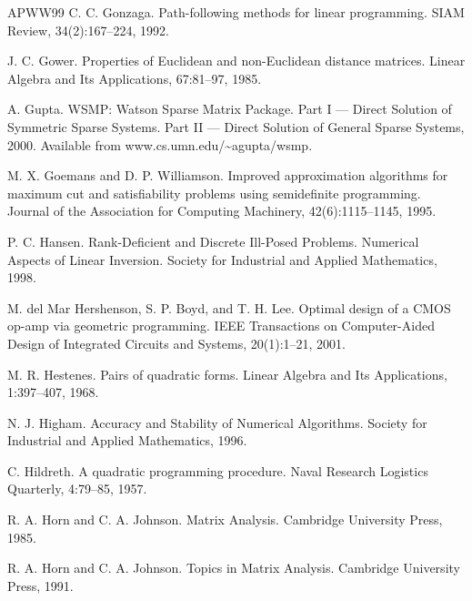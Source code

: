 \begin{thebibliography}{APWW99}
 C. C. Gonzaga. Path-following methods for linear programming. SIAM Review, 34(2):167–224, 1992.

 J. C. Gower. Properties of Euclidean and non-Euclidean distance matrices. Linear Algebra and Its Applications, 67:81–97, 1985.

 A. Gupta. WSMP: Watson Sparse Matrix Package. Part I — Direct Solution of Symmetric Sparse Systems. Part II — Direct Solution of General Sparse Systems, 2000. Available from www.cs.umn.edu/\textasciitilde{}agupta/wsmp.

 M. X. Goemans and D. P. Williamson. Improved approximation algorithms for maximum cut and satisfiability problems using semidefinite programming. Journal of the Association for Computing Machinery, 42(6):1115–1145, 1995.

 P. C. Hansen. Rank-Deficient and Discrete Ill-Posed Problems. Numerical Aspects of Linear Inversion. Society for Industrial and Applied Mathematics, 1998.

 M. del Mar Hershenson, S. P. Boyd, and T. H. Lee. Optimal design of a CMOS op-amp via geometric programming. IEEE Transactions on Computer-Aided Design of Integrated Circuits and Systems, 20(1):1–21, 2001.

 M. R. Hestenes. Pairs of quadratic forms. Linear Algebra and Its Applications, 1:397–407, 1968.

 N. J. Higham. Accuracy and Stability of Numerical Algorithms. Society for Industrial and Applied Mathematics, 1996.

 C. Hildreth. A quadratic programming procedure. Naval Research Logistics Quarterly, 4:79–85, 1957.

 R. A. Horn and C. A. Johnson. Matrix Analysis. Cambridge University Press, 1985.

 R. A. Horn and C. A. Johnson. Topics in Matrix Analysis. Cambridge University Press, 1991.


\end{thebibliography}
